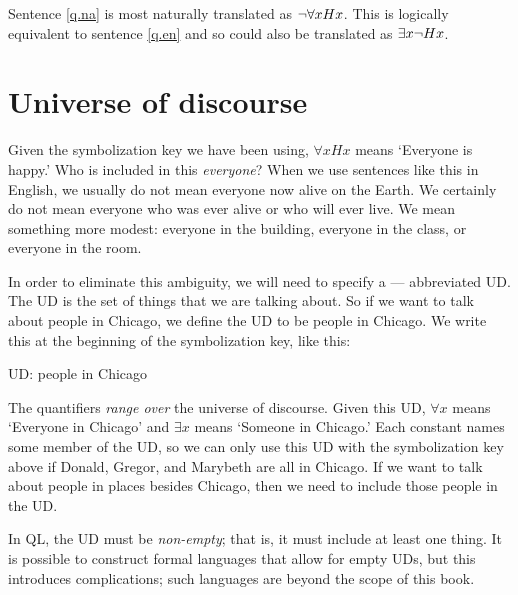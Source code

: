 Sentence \ref{q.na} is most naturally translated as $\neg\forall x Hx$. This is logically equivalent to sentence \ref{q.en} and so could also be translated as $\exists x \neg Hx$.



\section{Universe of discourse}
Given the symbolization key we have been using, $\forall xHx$ means `Everyone is happy.' Who is included in this \emph{everyone}? When we use sentences like this in English, we usually do not mean everyone now alive on the Earth. We certainly do not mean everyone who was ever alive or who will ever live. We mean something more modest: everyone in the building, everyone in the class, or everyone in the room.

In order to eliminate this ambiguity, we will need to specify a --- abbreviated UD. The UD is the set of things that we are talking about. So if we want to talk about people in Chicago, we define the UD to be people in Chicago. We write this at the beginning of the symbolization key, like this:
\begin{ekey}
\item[UD:] people in Chicago
\end{ekey}
The quantifiers \emph{range over} the universe of discourse. Given this UD, $\forall x$ means `Everyone in Chicago' and $\exists x$ means `Someone in Chicago.' Each constant names some member of the UD, so we can only use this UD with the symbolization key above if Donald, Gregor, and Marybeth are all in Chicago. If we want to talk about people in places besides Chicago, then we need to include those people in the UD.

In QL, the UD must be \emph{non-empty}; that is, it must include at least one thing. It is possible to construct formal languages that allow for empty UDs, but this introduces complications; such languages are beyond the scope of this book.

